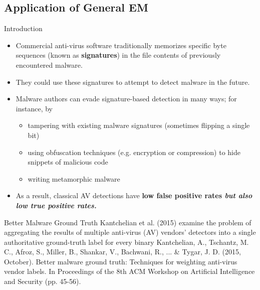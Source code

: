 \documentclass[10pt]{beamer}
\begin{document}
\subsection{Application of General EM}
\begin{frame}{Introduction}
\begin{itemize}
\item Commercial anti-virus software traditionally memorizes specific byte sequences (known as \textbf{signatures}) in the file contents of previously encountered malware. 
\item They could use these signatures to attempt to detect malware in the future.
\item Malware authors can evade signature-based detection in many ways; for instance, by
	\begin{itemize}
	\item tampering with existing malware signatures (sometimes flipping a single bit)
	\item  using obfuscation techniques (e.g. encryption or compression) to hide snippets of malicious code
	\item writing metamorphic malware
	\end{itemize}
\item As a result, classical AV detections have \bf{low false positive} rates \it{but also} \bf{low true positive} rates.
\end{itemize}
\end{frame}

\begin{frame}{Better Malware Ground Truth}
Kantchelian et al. (2015) examine the problem of aggregating the results of multiple anti-virus (AV) vendors’ detectors into a single authoritative ground-truth label for every binary
\vfill \vfill \vfill
\tiny Kantchelian, A., Tschantz, M. C., Afroz, S., Miller, B., Shankar, V., Bachwani, R., ... \& Tygar, J. D. (2015, October). Better malware ground truth: Techniques for weighting anti-virus vendor labels. In Proceedings of the 8th ACM Workshop on Artificial Intelligence and Security (pp. 45-56).
\end{frame}
\end{document}
